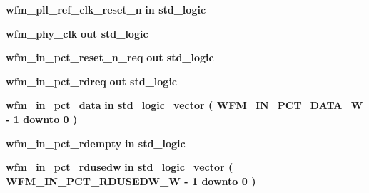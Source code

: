 \begin{DoxyCompactItemize}
{\bf wfm\+\_\+pll\+\_\+ref\+\_\+clk\+\_\+reset\+\_\+n}  {\bfseries {\bfseries \textcolor{keywordflow}{in}\textcolor{vhdlchar}{ }}} {\bfseries \textcolor{comment}{std\+\_\+logic}\textcolor{vhdlchar}{ }} 
\item 
{\bf wfm\+\_\+phy\+\_\+clk}  {\bfseries {\bfseries \textcolor{keywordflow}{out}\textcolor{vhdlchar}{ }}} {\bfseries \textcolor{comment}{std\+\_\+logic}\textcolor{vhdlchar}{ }} 
\item 
{\bf wfm\+\_\+in\+\_\+pct\+\_\+reset\+\_\+n\+\_\+req}  {\bfseries {\bfseries \textcolor{keywordflow}{out}\textcolor{vhdlchar}{ }}} {\bfseries \textcolor{comment}{std\+\_\+logic}\textcolor{vhdlchar}{ }} 
\item 
{\bf wfm\+\_\+in\+\_\+pct\+\_\+rdreq}  {\bfseries {\bfseries \textcolor{keywordflow}{out}\textcolor{vhdlchar}{ }}} {\bfseries \textcolor{comment}{std\+\_\+logic}\textcolor{vhdlchar}{ }} 
\item 
{\bf wfm\+\_\+in\+\_\+pct\+\_\+data}  {\bfseries {\bfseries \textcolor{keywordflow}{in}\textcolor{vhdlchar}{ }}} {\bfseries \textcolor{comment}{std\+\_\+logic\+\_\+vector}\textcolor{vhdlchar}{ }\textcolor{vhdlchar}{(}\textcolor{vhdlchar}{ }\textcolor{vhdlchar}{ }\textcolor{vhdlchar}{ }\textcolor{vhdlchar}{ }{\bfseries {\bf W\+F\+M\+\_\+\+I\+N\+\_\+\+P\+C\+T\+\_\+\+D\+A\+T\+A\+\_\+W}} \textcolor{vhdlchar}{-\/}\textcolor{vhdlchar}{ } \textcolor{vhdldigit}{1} \textcolor{vhdlchar}{ }\textcolor{keywordflow}{downto}\textcolor{vhdlchar}{ }\textcolor{vhdlchar}{ } \textcolor{vhdldigit}{0} \textcolor{vhdlchar}{ }\textcolor{vhdlchar}{)}\textcolor{vhdlchar}{ }} 
\item 
{\bf wfm\+\_\+in\+\_\+pct\+\_\+rdempty}  {\bfseries {\bfseries \textcolor{keywordflow}{in}\textcolor{vhdlchar}{ }}} {\bfseries \textcolor{comment}{std\+\_\+logic}\textcolor{vhdlchar}{ }} 
\item 
{\bf wfm\+\_\+in\+\_\+pct\+\_\+rdusedw}  {\bfseries {\bfseries \textcolor{keywordflow}{in}\textcolor{vhdlchar}{ }}} {\bfseries \textcolor{comment}{std\+\_\+logic\+\_\+vector}\textcolor{vhdlchar}{ }\textcolor{vhdlchar}{(}\textcolor{vhdlchar}{ }\textcolor{vhdlchar}{ }\textcolor{vhdlchar}{ }\textcolor{vhdlchar}{ }{\bfseries {\bf W\+F\+M\+\_\+\+I\+N\+\_\+\+P\+C\+T\+\_\+\+R\+D\+U\+S\+E\+D\+W\+\_\+W}} \textcolor{vhdlchar}{-\/}\textcolor{vhdlchar}{ } \textcolor{vhdldigit}{1} \textcolor{vhdlchar}{ }\textcolor{keywordflow}{downto}\textcolor{vhdlchar}{ }\textcolor{vhdlchar}{ } \textcolor{vhdldigit}{0} \textcolor{vhdlchar}{ }\textcolor{vhdlchar}{)}\textcolor{vhdlchar}{ }} 
\item 

\end{DoxyCompactItemize}
